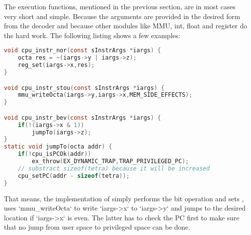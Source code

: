 The execution functions, mentioned in the previous section, are in most cases very short and simple. Because the arguments are provided in the desired form from the decoder and because other modules like MMU, int, float and register do the hard work. The following listing shows a few examples:
\begin{lstlisting}[language=C,caption=Examples of the execution functions]
void cpu_instr_nor(const sInstrArgs *iargs) {
	octa res = ~(iargs->y | iargs->z);
	reg_set(iargs->x,res);
}

void cpu_instr_stou(const sInstrArgs *iargs) {
	mmu_writeOcta(iargs->y,iargs->x,MEM_SIDE_EFFECTS);
}

void cpu_instr_bev(const sInstrArgs *iargs) {
	if(!(iargs->x & 1))
		jumpTo(iargs->z);
}
static void jumpTo(octa addr) {
	if(!cpu_isPCOk(addr))
		ex_throw(EX_DYNAMIC_TRAP,TRAP_PRIVILEGED_PC);
	// substract sizeof(tetra) because it will be increased
	cpu_setPC(addr - sizeof(tetra));
}
\end{lstlisting}
That means, the implementation of  simply performs the bit operation and sets ,  uses `mmu_writeOcta` to write `iargs->x` to `iargs->y` and  jumps to the desired location if `iargs->x` is even. The latter has to check the \gls{PC} first to make sure that no jump from user space to privileged space can be done.


